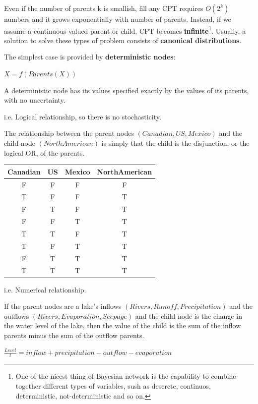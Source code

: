 Even if the number of parents k is smallish, fill any CPT requires $O(2^k)$ numbers and it grows exponentially with number of parents. Instead, if we assume a 
continuous-valued parent or child, CPT becomes \textbf{infinite}\footnote{One of the nicest thing of Bayesian network is the capability to combine together
different types of variables, sush as descrete, continuos, deterministic, not-deterministic and so on.}. Usually, a solution to solve these types of
problem consists of \textbf{canonical distributions}. \vspace{3.5pt}

The simplest case is provided by \textbf{deterministic nodes}:
\begin{center}
    $X = f(Parents(X))$
\end{center}
A deterministic node has its values specified exactly by the values of its parents, with no uncertainty.
\begin{example}
    i.e. Logical relationship, so there is no stochasticity. \vspace{3.5pt}

    The relationship between the parent nodes $(Canadian, US, Mexico)$ and the child node $(NorthAmerican)$ is simply that the child is the disjunction, or the logical OR,
    of the parents. \vspace{3.5pt}

    \begin{center}
        \begin{tabular}{|c|c|c|c|}
            \hline
            \bf Canadian & \bf US & \bf Mexico & \bf NorthAmerican  \\
            \hline
            F & F & F & F \\
            T & F & F & T \\
            F & T & F & T \\
            F & F & T & T \\
            T & T & F & T \\
            T & F & T & T \\
            F & T & T & T \\
            T & T & T & T \\
            \hline
        \end{tabular}
    \end{center} \vspace{7pt}

    i.e. Numerical relationship. \vspace{3.5pt}
    
    If the parent nodes are a lake's inflows $(Rivers, Runoff, Precipitation)$ and the outflows $(Rivers, Evaporation, Seepage)$ and the child node is the
    change in the water level of the lake, then the value of the child is the sum of the inflow parents minus the sum of the outflow parents. \vspace{3.5pt}

    \begin{center}
        $\frac{Level}{t}=inflow+precipitation-outflow-evaporation$
    \end{center}
\end{example}

